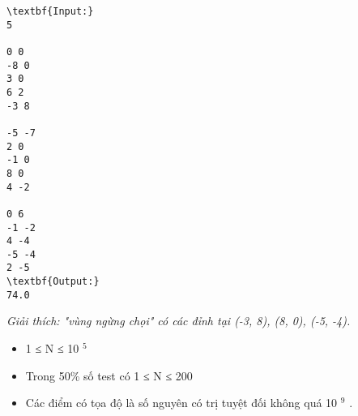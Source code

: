 \begin{verbatim}
\textbf{Input:}
5

0 0
-8 0
3 0
6 2
-3 8

-5 -7
2 0
-1 0
8 0
4 -2

0 6
-1 -2
4 -4
-5 -4
2 -5
\textbf{Output:}
74.0\end{verbatim}

\emph{    Giải thích: "vùng ngừng chọi" có các đỉnh tại (-3, 8), (8, 0), (-5, -4).   }
\begin{itemize}
	\item     1 ≤ N ≤ 10    $^     5    $
	\item     Trong 50\% số test có 1 ≤ N ≤ 200   
	\item     Các điểm có tọa độ là số nguyên có trị tuyệt đối không quá 10    $^     9    $    .   
\end{itemize}